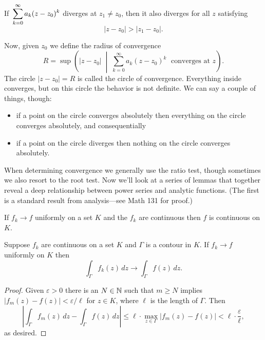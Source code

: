 \documentclass[../m136main.tex]{subfiles}
\begin{document}
\begin{corollary}[]
    \vspace{-4pt} If $\,\displaystyle \sum_{k=0}^{\infty} a_k (z - z_0)^{k}$ diverges at $z_1 \neq z_0$, then it also diverges for all $z$ satisfying   \vspace{-6pt}
    \[ |z - z_0| > |z_1 - z_0|. \]
\end{corollary}

Now, given $z_0$ we define the radius of convergence
\[ R = \sup \left( |z - z_0| \;\middle|\; \sum_{k=0}^{\infty} a_k(z - z_0)^k \;\text{ converges at $z$} \right). \]
The circle $|z - z_0| = R$ is called the circle of convergence.
Everything inside converges, but on this circle the behavior is not definite.
We can say a couple of things, though:
\begin{itemize}[topsep=0pt]
    \item if a point on the circle converges absolutely then everything on the circle converges absolutely, and consequentially
    \item if a point on the circle diverges then nothing on the circle converges absolutely.
\end{itemize}
When determining convergence we generally use the ratio test, though sometimes we also resort to the root test.
Now we'll look at a series of lemmas that together reveal a deep relationship between power series and analytic functions.
(The first is a standard result from analysis---see Math 131 for proof.)

\begin{lemma}[]
    If $f_k \to f$ uniformly on a set $K$ and the $f_k$ are continuous then $f$ is continuous on $K$.
\end{lemma}

\begin{lemma}[]
    Suppose $f_k$ are continuous on a set $K$ and $\Gamma$ is a contour in $K$.
    If $f_k \to f$ uniformly on $K$ then
    \[ \int_\Gamma f_k(z) \,dz \longrightarrow \int_\Gamma f(z) \,dz. \]
\end{lemma}

\begin{proof}
    Given $\varepsilon > 0$ there is an $N \in \mathbb{N}$ such that $m \geq N$ implies $|f_m(z) - f(z)| < \varepsilon / \ell$ for $z \in K$, where $\ell$ is the length of $\Gamma$.
    Then
    \[ \left| \int_\Gamma f_m(z) \,dz - \int_\Gamma f(z) \,dz \right| \leq \ell \cdot \max_{z \in \Gamma} |f_m(z) - f(z)| < \ell \cdot \frac{\varepsilon}{\ell}, \]
    as desired.
\end{proof}
\end{document}
